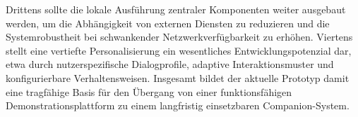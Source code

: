 Drittens sollte die lokale Ausführung zentraler Komponenten weiter ausgebaut werden, um die Abhängigkeit von externen Diensten zu reduzieren und die Systemrobustheit bei schwankender Netzwerkverfügbarkeit zu erhöhen. 
Viertens stellt eine vertiefte Personalisierung ein wesentliches Entwicklungspotenzial dar, etwa durch nutzerspezifische Dialogprofile, adaptive Interaktionsmuster und konfigurierbare Verhaltensweisen. 
Insgesamt bildet der aktuelle Prototyp damit eine tragfähige Basis für den Übergang von einer funktionsfähigen Demonstrationsplattform zu einem langfristig einsetzbaren Companion-System.
